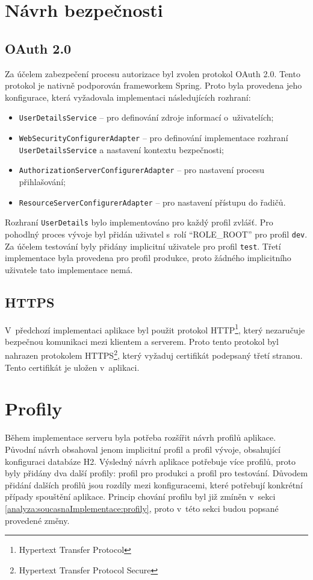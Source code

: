 \section{Návrh bezpečnosti}\label{navrh:bezpecnost}
    \subsection{OAuth 2.0}
        Za účelem zabezpečení procesu autorizace byl zvolen protokol OAuth 2.0. Tento protokol je nativně podporován frameworkem Spring. Proto byla provedena jeho konfigurace, která vyžadovala implementaci následujících rozhraní:
        \begin{itemize}
            \item \texttt{UserDetailsService} -- pro definování zdroje informací o~uživatelích;
            \item \texttt{WebSecurityConfigurerAdapter} -- pro definování implementace rozhraní \texttt{UserDetailsService} a nastavení kontextu bezpečnosti;
            \item \texttt{AuthorizationServerConfigurerAdapter} -- pro nastavení procesu přihlašování;
            \item \texttt{ResourceServerConfigurerAdapter} -- pro nastavení přístupu do řadičů.
        \end{itemize}
        
        Rozhraní \verb|UserDetails| bylo implementováno pro každý profil zvlášť. Pro pohodlný proces vývoje byl přidán uživatel s~rolí \enquote{ROLE\_ROOT} pro profil \verb|dev|. Za účelem testování byly přidány implicitní uživatele pro profil \verb|test|. Třetí implementace byla provedena pro profil produkce, proto žádného implicitního uživatele tato implementace nemá.
        
    \subsection{HTTPS}
        V~předchozí implementaci aplikace byl použit protokol HTTP\footnote{Hypertext Transfer Protocol}, který nezaručuje bezpečnou komunikaci mezi klientem a serverem. Proto tento protokol byl nahrazen protokolem HTTPS\footnote{Hypertext Transfer Protocol Secure}, který vyžaduj certifikát podepsaný třetí stranou. Tento certifikát je uložen v~aplikaci.
        
\section{Profily}\label{navrh:profily}
    Během implementace serveru byla potřeba rozšířit návrh profilů aplikace. Původní návrh obsahoval jenom implicitní profil a profil vývoje, obsahující konfiguraci databáze H2. Výsledný návrh aplikace potřebuje více profilů, proto byly přidány dva další profily: profil pro produkci a profil pro testování. Důvodem přidání dalších profilů jsou rozdíly mezi konfiguracemi, které potřebují konkrétní případy spouštění aplikace. Princip chování profilu byl již zmíněn v~sekci \ref{analyza:soucasnaImplementace:profily}, proto v~této sekci budou popsané provedené změny.
    
